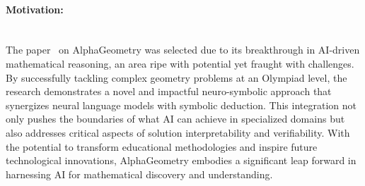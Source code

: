 \documentclass[12pt]{article}
\begin{document}
\paragraph{Motivation:}
~\\
The paper~\cite{4893487]} on AlphaGeometry was selected due to its breakthrough in AI-driven mathematical reasoning, an area ripe with potential yet fraught with challenges. By successfully tackling complex geometry problems at an Olympiad level, the research demonstrates a novel and impactful neuro-symbolic approach that synergizes neural language models with symbolic deduction. This integration not only pushes the boundaries of what AI can achieve in specialized domains but also addresses critical aspects of solution interpretability and verifiability. With the potential to transform educational methodologies and inspire future technological innovations, AlphaGeometry embodies a significant leap forward in harnessing AI for mathematical discovery and understanding.



\end{document}
